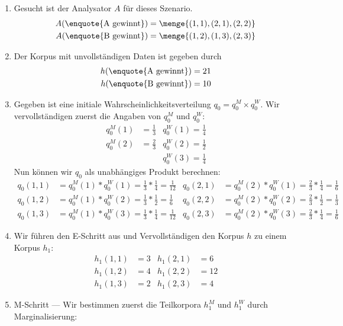 \documentclass[ngerman, a4paper, 12pt]{article}
\begin{document}
	\begin{enumerate}[label=(\alph*), leftmargin=0pt]
		\item Gesucht ist der Analysator $A$ für dieses Szenario.
		\begin{align*}
			A( \text{\enquote{A gewinnt}}) &= \menge{(1,1), (2,1), (2,2)} \\
			A( \text{\enquote{B gewinnt}}) &= \menge{(1,2), (1,3), (2,3)}			
		\end{align*}
		\item Der Korpus mit unvollständigen Daten ist gegeben durch
		\begin{align*}
			h(\text{\enquote{A gewinnt}}) &= 21 \\
			h(\text{\enquote{B gewinnt}}) &= 10
 		\end{align*}
 		\item Gegeben ist eine initiale Wahrscheinlichkeitsverteilung $q_0 = q_0^M \times q_0^W$. Wir vervollständigen zuerst die Angaben von $q_0^M$ und $q_0^W$:
 		\begin{align*}
 			q_0^M(1) &= \frac{1}{3} & q_0^W(1) = \frac{1}{4} \\
 			q_0^M(2) &= \frac{2}{3} & q_0^W(2) = \frac{1}{2} \\
 			 		 &              & q_0^W(3) = \frac{1}{4} 
 		\end{align*}
 		Nun können wir $q_0$ als unabhängiges Produkt berechnen:
 		\begin{align*}
 			q_0(1,1) &= q_0^M(1) * q_0^W(1) = \frac{1}{3} * \frac{1}{4} = \frac{1}{12} &
 			q_0(2,1) &= q_0^M(2) * q_0^W(1) = \frac{2}{3} * \frac{1}{4} = \frac{1}{6} \\
 			q_0(1,2) &= q_0^M(1) * q_0^W(2) = \frac{1}{3} * \frac{1}{2} = \frac{1}{6} &
 			q_0(2,2) &= q_0^M(2) * q_0^W(2) = \frac{2}{3} * \frac{1}{2} = \frac{1}{3} \\
 			q_0(1,3) &= q_0^M(1) * q_0^W(3) = \frac{1}{3} * \frac{1}{4} = \frac{1}{12} &
 			q_0(2,3) &= q_0^M(2) * q_0^W(3) = \frac{2}{3} * \frac{1}{4} = \frac{1}{6}
 		\end{align*}
 		\item Wir führen den E-Schritt aus und Vervollständigen den Korpus $h$ zu einem Korpus $h_1$:
 		\begin{align*}
 			h_1(1,1) &= 3 & h_1(2,1) &= 6 \\
 			h_1(1,2) &= 4 & h_1(2,2) &= 12 \\
 			h_1(1,3) &= 2 & h_1(2,3) &= 4
 		\end{align*}
 		\item M-Schritt --- Wir bestimmen zuerst die Teilkorpora $h_1^M$ und $h_1^W$ durch Marginalisierung:

\end{enumerate}
\end{document}
